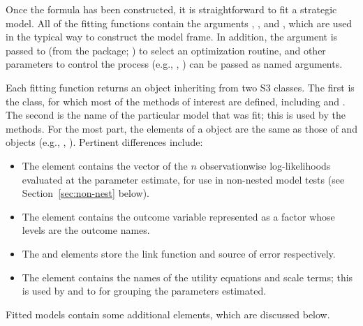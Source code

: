 \documentclass[article]{jss}
\begin{document}
Once the formula has been constructed, it is straightforward to fit a strategic
model.  All of the fitting functions contain the arguments ,
, and , which are used in the typical way to
construct the model frame.  In addition, the  argument is passed to
 (from the  package; \citealt{maxLikpkg}) to select an
optimization routine, and other parameters to control the process (e.g.,
, ) can be passed as named arguments.

Each fitting function returns an object inheriting from two S3 classes.  The
first is the  class, for which most of the methods of interest are
defined, including  and .  The second is the name of
the particular model that was fit; this is used by the  methods.
For the most part, the elements of a  object are the same as those
of  and  objects (e.g., ,
).  Pertinent differences include:
\begin{itemize}
  \item The  element contains the vector of the $n$
  observationwise log-likelihoods evaluated at the parameter estimate, for use
  in non-nested model tests (see Section~\ref{sec:non-nest} below).
  \item The  element contains the outcome variable represented as a
  factor whose levels are the outcome names.
  \item The  and  elements store the link function and
  source of error respectively.
  \item The  element contains the names of the utility equations
  and scale terms; this is used by  and  to
  for grouping the parameters estimated.
\end{itemize}
Fitted  models contain some additional elements, which are
discussed below.
\end{document}
